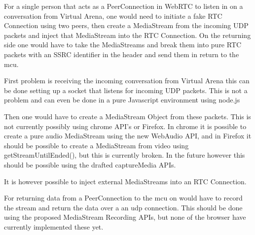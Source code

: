 For a single person that acts as a PeerConnection in WebRTC to listen in on a conversation from Virtual Arena, one would need to initiate a fake RTC Connection using two peers, then create a MediaStream from the incoming UDP packets and inject that MediaStream into the RTC Connection. On the returning side one would have to take the MediaStreams and break them into pure RTC packets with an SSRC identifier in the header and send them in return to the \gls{mcu}.

First problem is receiving the incoming conversation from Virtual Arena this can be done setting up a socket that listens for incoming UDP packets. This is not a problem and can even be done in a pure Javascript environment using node.js

Then one would have to create a MediaStream Object from these packets. This is not currently possibly using chrome API's or Firefox. In chrome it is possible to create a pure audio MediaStream using the new WebAudio API, and in Firefox it should be possible to create a MediaStream from video using getStreamUntilEnded(), but this is currently broken. In the future however this should be possible using the drafted captureMedia APIs.

It is however possible to inject external MediaStreams into an RTC Connection.

For returning data from a PeerConnection to the \gls{mcu} on would have to record the stream and return the data over a an \gls{udp} connection. This should be done using the proposed MediaStream Recording APIs, but none of the browser have currently implemented these yet.